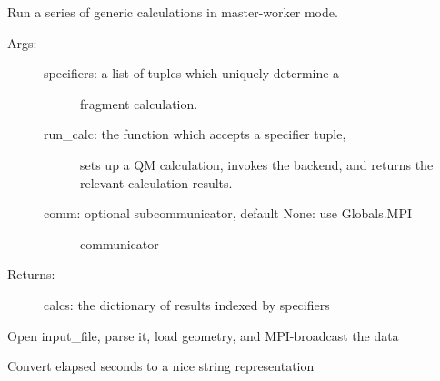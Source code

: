 \documentclass[letterpaper,10pt,english]{sphinxmanual}
\begin{document}

\begin{fulllineitems}
\label{\detokenize{globals:Globals.utility.mw_execute}}
Run a series of generic calculations in master-worker mode.
\begin{description}
\item[{Args:}] \leavevmode\begin{description}
\item[{specifiers: a list of tuples which uniquely determine a}] \leavevmode
fragment calculation.

\item[{run\_calc: the function which accepts a specifier tuple,}] \leavevmode
sets up a QM calculation, invokes the backend, and
returns the relevant calculation results.

\item[{comm: optional subcommunicator, default None: use Globals.MPI}] \leavevmode
communicator

\end{description}

\item[{Returns:}] \leavevmode
calcs: the dictionary of results indexed by specifiers

\end{description}

\end{fulllineitems}


\begin{fulllineitems}
\label{\detokenize{globals:Globals.utility.parse_input}}
Open input\_file, parse it, load geometry, and MPI-broadcast the data

\end{fulllineitems}


\begin{fulllineitems}
\label{\detokenize{globals:Globals.utility.pretty_time}}
Convert elapsed seconds to a nice string representation

\end{fulllineitems}
\end{document}
